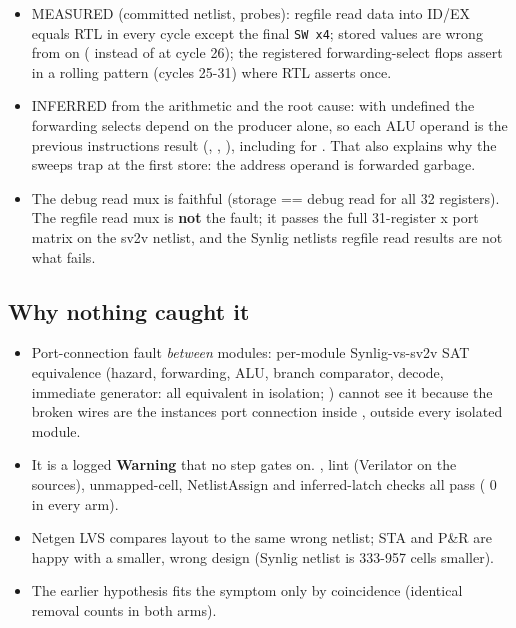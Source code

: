 \begin{record}

\begin{itemize}
\tightlist
\item
  MEASURED (committed netlist,  probes): regfile read
  data into ID/EX equals RTL in every cycle except the final
  \texttt{SW\ x4}; stored values are wrong from  on
  ( instead of  at cycle 26); the registered
  forwarding-select flops assert in a rolling pattern (cycles 25-31)
  where RTL asserts once.
\item
  INFERRED from the arithmetic and the root cause: with
   undefined the forwarding selects depend on the
  producer alone, so each ALU operand is the previous
  instruction\textquotesingle s result (, ,
  ), including for . That also explains why the
  sweeps trap at the first store: the address operand is forwarded
  garbage.
\item
  The debug read mux is faithful (storage == debug read for all 32
  registers). The regfile read mux is \textbf{not} the fault; it passes
  the full 31-register x port matrix on the sv2v netlist, and the Synlig
  netlist\textquotesingle s regfile read results are not what fails.
\end{itemize}

\end{record}

\subsection{Why nothing caught it}\label{cr:defect:sky130-cpu-synlig-dud4:why-nothing-caught-it}

\begin{record}

\begin{itemize}
\tightlist
\item
  Port-connection fault \emph{between} modules: per-module
  Synlig-vs-sv2v SAT equivalence (hazard, forwarding, ALU, branch
  comparator, decode, immediate generator: all equivalent in isolation;
  ) cannot see it because the broken wires are
  the instance\textquotesingle s port connection inside
  , outside every isolated module.
\item
  It is a logged \textbf{Warning} that no step gates on.
  , lint (Verilator on the sources),
  unmapped-cell, NetlistAssign and inferred-latch checks all pass
  ( 0 in every arm).
\item
  Netgen LVS compares layout to the same wrong netlist; STA and P\&R are
  happy with a smaller, wrong design (Synlig netlist is 333-957 cells
  smaller).
\item
  The earlier  hypothesis fits the symptom only by
  coincidence (identical removal counts in both arms).
\end{itemize}

\end{record}

